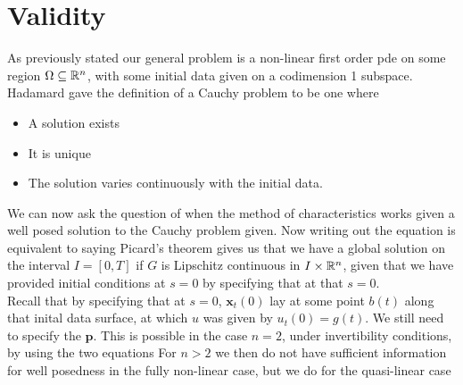 \documentclass{article}
\begin{document}
\section{Validity}
As previously stated our general problem is a non-linear first order pde 
on some region $\Omega \subseteq \mathbb{R}^n$, with some initial data given on a codimension 1 subspace. Hadamard gave the definition of a  Cauchy problem to be one where 
\begin{itemize}
    \item A solution exists
    \item It is unique
    \item The solution varies continuously with the initial data. 
\end{itemize}
We can now ask the question of when the method of characteristics works given a well posed solution to the Cauchy problem given. Now writing out the equation 
is equivalent to saying 
Picard's theorem gives us that we have a global solution on the interval $I=[0,T]$ if $G$ is Lipschitz continuous in $I \times \mathbb{R}^n$, given that we have provided initial conditions at $s=0$ by specifying that at that $s=0$.\\
Recall that by specifying that at $s=0$, $\bm{x}_t(0)$ lay at some point $b(t)$ along that inital data surface, at which $u$ was given by $u_t(0) = g(t)$. We still need to specify the $\bm{p}$. This is possible in the case $n=2$, under invertibility conditions, by using the two equations 
For $n>2$ we then do not have sufficient information for well posedness in the fully non-linear case, but we do for the quasi-linear case \\
\end{document}
